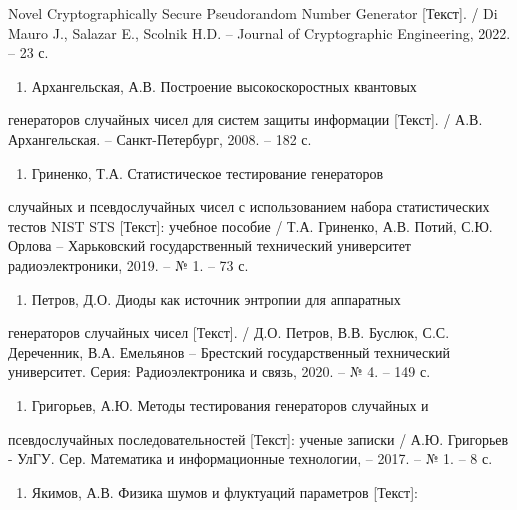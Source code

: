 Novel Cryptographically Secure Pseudorandom Number Generator
{[}Текст{]}. / Di Mauro J., Salazar E., Scolnik H.D. -- Journal of
Cryptographic Engineering, 2022. -- 23 с.

\begin{enumerate}
\def\labelenumi{\arabic{enumi}.}
\setcounter{enumi}{6}
\item
  Архангельская, А.В. Построение высокоскоростных квантовых
\end{enumerate}

генераторов случайных чисел для систем защиты информации {[}Текст{]}. /
А.В. Архангельская. -- Санкт-Петербург, 2008. -- 182 с.

\begin{enumerate}
\def\labelenumi{\arabic{enumi}.}
\setcounter{enumi}{7}
\item
  Гриненко, Т.А. Статистическое тестирование генераторов
\end{enumerate}

случайных и псевдослучайных чисел с использованием набора статистических
тестов NIST STS {[}Текст{]}: учебное пособие / Т.А. Гриненко, А.В.
Потий, С.Ю. Орлова -- Харьковский государственный технический
университет радиоэлектроники, 2019. -- № 1. -- 73 с.

\begin{enumerate}
\def\labelenumi{\arabic{enumi}.}
\setcounter{enumi}{8}
\item
  Петров, Д.О. Диоды как источник энтропии для аппаратных
\end{enumerate}

генераторов случайных чисел {[}Текст{]}. / Д.О. Петров, В.В. Буслюк,
С.С. Дереченник, В.А. Емельянов -- Брестский государственный технический
университет. Серия: Радиоэлектроника и связь, 2020. -- № 4. -- 149 с.

\begin{enumerate}
\def\labelenumi{\arabic{enumi}.}
\setcounter{enumi}{9}
\item
  Григорьев, А.Ю. Методы тестирования генераторов случайных и
\end{enumerate}

псевдослучайных последовательностей {[}Текст{]}: ученые записки / А.Ю.
Григорьев - УлГУ. Сер. Математика и информационные технологии, -- 2017.
-- № 1. -- 8 с.

\begin{enumerate}
\def\labelenumi{\arabic{enumi}.}
\setcounter{enumi}{10}
\item
  Якимов, А.В. Физика шумов и флуктуаций параметров {[}Текст{]}:
\end{enumerate}


